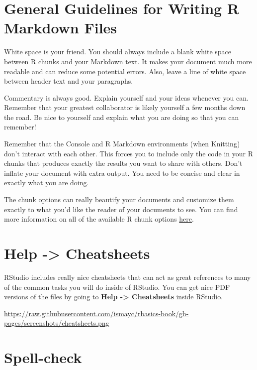 \documentclass[]{tufte-book}
\theoremstyle{definition}
\theoremstyle{definition}
\theoremstyle{remark}
\begin{document}
\section{General Guidelines for Writing R Markdown
Files}\label{general-guidelines-for-writing-r-markdown-files}

White space is your friend. You should always include a blank white
space between R chunks and your Markdown text. It makes your document
much more readable and can reduce some potential errors. Also, leave a
line of white space between header text and your paragraphs.

Commentary is always good. Explain yourself and your ideas whenever you
can. Remember that your greatest collaborator is likely yourself a few
months down the road. Be nice to yourself and explain what you are doing
so that you can remember!

Remember that the Console and R Markdown environments (when Knitting)
don't interact with each other. This forces you to include only the code
in your R chunks that produces exactly the results you want to share
with others. Don't inflate your document with extra output. You need to
be concise and clear in exactly what you are doing.

The chunk options can really beautify your documents and customize them
exactly to what you'd like the reader of your documents to see. You can
find more information on all of the available R chunk options
\href{http://yihui.name/knitr/options/}{here}.

\section{Help -\textgreater{} Cheatsheets}\label{help---cheatsheets}

RStudio includes really nice cheatsheets that can act as great
references to many of the common tasks you will do inside of RStudio.
You can get nice PDF versions of the files by going to \textbf{Help
-\textgreater{} Cheatsheets} inside RStudio.

\vspace{0.1in}

\begin{center}\footnotesize{\url{https://raw.githubusercontent.com/ismayc/rbasics-book/gh-pages/screenshots/cheatsheets.png}}\end{center}

\vspace{0.1in}

\section{Spell-check}\label{spell-check}
\end{document}
